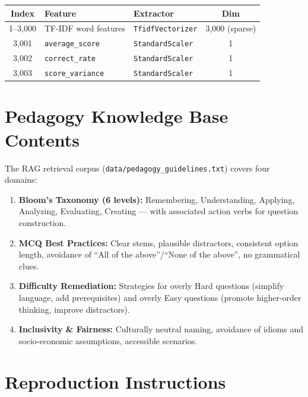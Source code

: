 \documentclass[12pt, a4paper, twoside]{article}
\newcommand{\code}[1]{\texttt{#1}}
\begin{document}
\begin{center}
\renewcommand{\arraystretch}{1.2}
\begin{tabular}{c l l c}
    \toprule
    \textbf{Index} & \textbf{Feature} & \textbf{Extractor} &
    \textbf{Dim} \\
    \midrule
    1--3{,}000 & TF-IDF word features &
    \code{TfidfVectorizer} & 3{,}000 (sparse) \\
    3{,}001 & \code{average\_score}   &
    \code{StandardScaler} & 1 \\
    3{,}002 & \code{correct\_rate}    &
    \code{StandardScaler} & 1 \\
    3{,}003 & \code{score\_variance}  &
    \code{StandardScaler} & 1 \\
    \bottomrule
\end{tabular}
\end{center}

\section{Pedagogy Knowledge Base Contents}\label{app:pedagogy}

The RAG retrieval corpus (\code{data/pedagogy\_guidelines.txt})
covers four domains:

\begin{enumerate}[leftmargin=2em]
    \item \textbf{Bloom's Taxonomy (6 levels):} Remembering,
          Understanding, Applying, Analyzing, Evaluating, Creating ---
          with associated action verbs for question construction.

    \item \textbf{MCQ Best Practices:} Clear stems, plausible
          distractors, consistent option length, avoidance of
          \enquote{All of the above}/\enquote{None of the above},
          no grammatical clues.

    \item \textbf{Difficulty Remediation:} Strategies for overly
          Hard questions (simplify language, add prerequisites) and
          overly Easy questions (promote higher-order thinking,
          improve distractors).

    \item \textbf{Inclusivity \& Fairness:} Culturally neutral
          naming, avoidance of idioms and socio-economic assumptions,
          accessible scenarios.
\end{enumerate}

\section{Reproduction Instructions}\label{app:reproduce}
\end{document}
